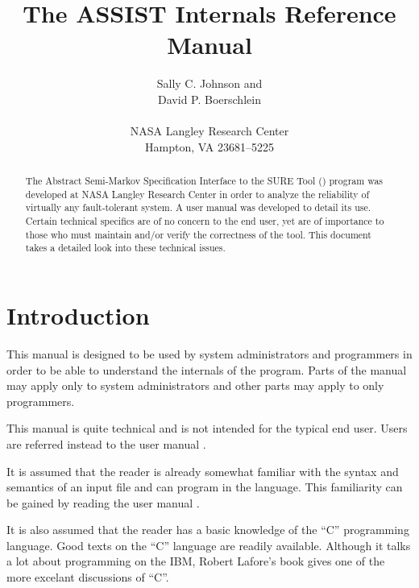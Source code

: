 \title{The ASSIST Internals Reference Manual}
\author{Sally C. Johnson
        and \\
        David P. Boerschlein \\
         ~\\
         NASA Langley Research Center \\
          Hampton, VA 23681--5225 \\
       }
\maketitle
\begin{abstract}
The Abstract Semi-Markov Specification Interface to the
SURE Tool () program was developed at NASA Langley Research
Center in order to analyze the reliability of virtually any
fault-tolerant system.   A user manual \cite{assist7man} was developed to
detail its use.   Certain technical specifics are of no concern to the end
user, yet are of importance to those who must maintain and/or verify the
correctness of the tool.   This document takes a detailed look into these
technical issues.
\end{abstract}
 

\tableofcontents
\listoftables
\listoffigures
\newpage
{}
\section{Introduction}

This manual is designed to be used by system administrators and programmers
in order to be able to understand the internals of the 
program.   Parts of the manual may apply only to system administrators and
other parts may apply to only programmers.

This manual is quite technical and is not intended for the typical
end user.   Users are referred instead to the
user manual \cite{assist7man}.

It is assumed that the reader is already somewhat familiar with the syntax
and semantics of an  input file and can program in the
language.   This familiarity can be gained by reading the
user manual \cite{assist7man}.

It is also assumed that the reader has a basic knowledge of the
 ``C''
programming language.   Good texts on
the ``C'' language
\cite{Kernighan,Microsoft,quick} are readily
available.   Although it talks a lot about programming on the IBM,
Robert Lafore's book \cite{Microsoft} gives one of the more excelant
discussions of  ``C''.

